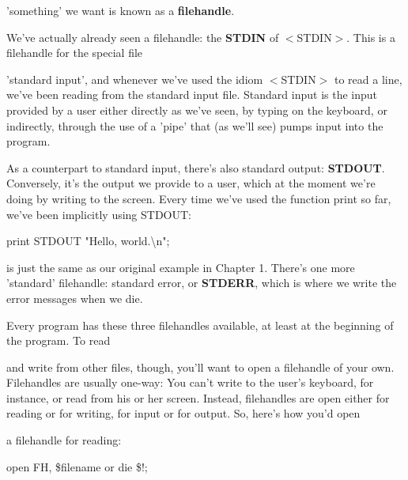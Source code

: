 \documentclass[a4paper,11pt]{book}
\begin{document}
\noindent 'something' we want is known as a \textbf{filehandle}.

\noindent 

\noindent We've actually already seen a filehandle: the \textbf{STDIN }of $<$STDIN$>$. This is a filehandle for the special file

\noindent 'standard input', and whenever we've used the idiom $<$STDIN$>$ to read a line, we've been reading from the standard input file. Standard input is the input provided by a user either directly as we've seen, by typing on the keyboard, or indirectly, through the use of a 'pipe' that (as we'll see) pumps input into the program.

\noindent 

\noindent As a counterpart to standard input, there's also standard output: \textbf{STDOUT}. Conversely, it's the output we provide to a user, which at the moment we're doing by writing to the screen. Every time we've used the function print so far, we've been implicitly using   STDOUT:

\noindent 

\noindent print STDOUT "Hello, world.\textbackslash n";

\noindent 

\noindent is just the same as our original example in Chapter 1. There's one more 'standard' filehandle: standard error, or \textbf{STDERR}, which is where we write the error messages when we die.

\noindent  

\noindent  

\noindent  

\noindent  

\noindent 

\noindent 

\noindent Every program has these three filehandles available, at least at the beginning of the program. To read

\noindent and write from other files, though, you'll want to open a filehandle of your own. Filehandles are usually one-way: You can't write to the user's keyboard, for instance, or read from his or her screen. Instead, filehandles are open either for reading or for writing, for input or for output. So, here's how you'd open

\noindent a filehandle for reading:

\noindent 

\noindent 

\noindent open FH, \$filename or die \$!;
\end{document}
